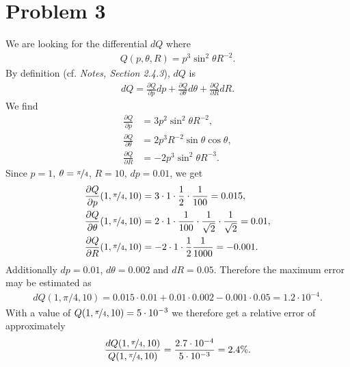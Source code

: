 \documentclass{article}
\newcommand{\p}{\partial }
\begin{document}
\section*{Problem 3}
We are looking for the differential $dQ$ where
\begin{align*}
  Q(p, \theta, R)=p^3\sin^2\theta R^{-2}.
\end{align*}
By definition (cf. \emph{Notes, Section 2.4.3}), $dQ$ is
\begin{align*}
  dQ=\frac{\p Q}{\p p}dp + \frac{\p Q}{\p\theta}d\theta + \frac{\p Q}{\p R}dR.
\end{align*}
We find
\begin{align*}
  \frac{\p Q}{\p p}&= 3p^2\sin^2\theta R^{-2},\\
  \frac{\p Q}{\p\theta}&= 2p^3R^{-2}\sin\theta\cos\theta,\\
  \frac{\p Q}{\p R}&=-2p^3\sin^2\theta R^{-3}.
\end{align*}
Since $p=1$, $\theta=\nicefrac{\pi}{4}$, $R=10$, $dp=0.01$, we get
\begin{align*}
  \frac{\p Q}{\p p}(1, \nicefrac{\pi}{4}, 10)
  &=3\cdot 1 \cdot \frac{1}{2} \cdot \frac{1}{100}=0.015,\\
  \frac{\p Q}{\p\theta}(1, \nicefrac{\pi}{4}, 10)
  &=2\cdot 1 \cdot \frac{1}{100}\cdot\frac{1}{\sqrt{2}}\cdot\frac{1}{\sqrt{2}} =0.01,\\
  \frac{\p Q}{\p R}(1, \nicefrac{\pi}{4}, 10)
  &= -2\cdot 1 \cdot \frac{1}{2}\frac{1}{1000}=-0.001.
\end{align*}
Additionally $dp = 0.01$, $d\theta = 0.002$ and $dR=0.05$.
Therefore the maximum error may be estimated as
\begin{align*}
  dQ(1,\pi/4,10)=0.015\cdot 0.01+0.01\cdot 0.002  -0.001 \cdot 0.05=1.2\cdot10^{-4}.
\end{align*}
With a value of $Q(1,\nicefrac{\pi}{4},10)=5\cdot10^{-3}$ we therefore get a
relative error of approximately 
\begin{align*}
  \frac{dQ(1,\nicefrac{\pi}{4},10)}{Q(1,\nicefrac{\pi}{4},10)}=\frac{2.7\cdot10^{-4}}{5\cdot 10^{-3}}=2.4\%.
\end{align*}
\end{document}
